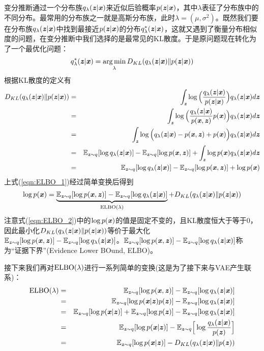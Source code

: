变分推断通过一个分布族$q_{\lambda}(\Vz|\Vx)$来近似后验概率$p(\Vz|\Vx)$，其中$\lambda$表征了分布族中的不同分布。最常用的分布族之一就是高斯分布族，此时$\lambda=(\mu,\sigma^{2})$。既然我们要在分布族$q_{\lambda}(\Vz|\Vx)$中找到最接近$p(\Vz|\Vx)$的分布$q_{\lambda}^{*}(\Vz|\Vx)$，这就又遇到了衡量分布相似度的问题，在变分推断中我们选择的是最常见的KL散度。于是原问题现在转化为了一个最优化问题：
\begin{eqnarray}
q_{\lambda}^{*}(\Vz|\Vx) = \mathop{\argmin}_{\lambda}D_{KL}(q_{\lambda}(\Vz|\Vx)\|p(\Vz|\Vx))
\end{eqnarray}
根据KL散度的定义有
\begin{eqnarray}
D_{KL}(q_{\lambda}(\Vz|\Vx)\|p(\Vz|\Vx))
&=& \int_{\Vz}\log\Big{(} \frac{q_{\lambda}(\Vz|\Vx)}{p(\Vz|\Vx)} \Big{)}q_{\lambda}(\Vz|\Vx)d\Vz \nonumber\\
&=& \int_{\Vz}\log\Big{(} \frac{q_{\lambda}(\Vz|\Vx)}{p(\Vx,\Vz)}p(\Vx) \Big{)}q_{\lambda}(\Vz|\Vx)d\Vz \nonumber\\
&=& \int_{\Vz}\log\Big{(} q_{\lambda}(\Vz|\Vx) - p(\Vx,\Vz) + p(\Vx) \Big{)}q_{\lambda}(\Vz|\Vx)d\Vz \nonumber\\
&=& \SetE_{\Vz\sim q}[\log q_{\lambda}(\Vz|\Vx)] - \SetE_{\Vz\sim q}[\log p(\Vx,\Vz)] + \int_{\Vz}\log p(\Vx)q_{\lambda}(\Vz|\Vx)d\Vz \nonumber\\
&=& \SetE_{\Vz\sim q}[\log q_{\lambda}(\Vz|\Vx)] - \SetE_{\Vz\sim q}[\log p(\Vx,\Vz)] + \log p(\Vx) \label{eqn:ELBO_1}
\end{eqnarray}
上式(\ref{eqn:ELBO_1})经过简单变换后得到
\begin{eqnarray}
\log p(\Vx) = \underbrace{\SetE_{\Vz\sim q}[\log p(\Vx,\Vz)] - \SetE_{\Vz\sim q}[\log q_{\lambda}(\Vz|\Vx)]}_{\rm{ELBO}(\lambda)} + D_{KL}(q_{\lambda}(\Vz|\Vx)\|p(\Vz|\Vx)) \label{eqn:ELBO_2}
\end{eqnarray}
注意式(\ref{eqn:ELBO_2})中的$\log p(\Vx)$的值是固定不变的，且KL散度恒大于等于$0$，因此最小化$D_{KL}(q_{\lambda}(\Vz|\Vx)\|p(\Vz|\Vx))$等价于最大化$\SetE_{\Vz\sim q}[\log p(\Vx,\Vz)] - \SetE_{\Vz\sim q}[\log q_{\lambda}(\Vz|\Vx)]$。$\SetE_{\Vz\sim q}[\log p(\Vx,\Vz)] - \SetE_{\Vz\sim q}[\log q_{\lambda}(\Vz|\Vx)]$称为“证据下界”(Evidence Lower BOund, ELBO)。

接下来我们再对$\rm{ELBO}(\lambda)$进行一系列简单的变换(这是为了接下来与VAE产生联系)：
\begin{eqnarray}
\rm{ELBO}(\lambda)
&=& \SetE_{\Vz\sim q}[\log p(\Vx,\Vz)] - \SetE_{\Vz\sim q}[\log q_{\lambda}(\Vz|\Vx)] \nonumber\\
&=& \SetE_{\Vz\sim q}[\log p(\Vx|\Vz)p(\Vz)] - \SetE_{\Vz\sim q}[\log q_{\lambda}(\Vz|\Vx)] \nonumber\\
&=& \SetE_{\Vz\sim q}[\log p(\Vx|\Vz)] + \SetE_{\Vz\sim q}[\log p(\Vz)] - \SetE_{\Vz\sim q}[\log q_{\lambda}(\Vz|\Vx)] \nonumber\\
&=& \SetE_{\Vz\sim q}[\log p(\Vx|\Vz)] - \SetE_{\Vz\sim q}\Big{[}\log \frac{q_{\lambda}(\Vz|\Vx)}{p(\Vz)}\Big{]} \nonumber\\
&=& \SetE_{\Vz\sim q}[\log p(\Vx|\Vz)] - D_{KL}(q_{\lambda}(\Vz|\Vx)\|p(\Vz))
\end{eqnarray}

